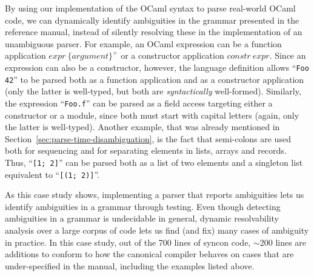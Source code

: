 \documentclass[acmsmall,review,anonymous]{acmart}\settopmatter{printfolios=true,printccs=false,printacmref=false}
\newcommand{\ocaml}{\lstinline[language={[objective]caml}]}
\begin{document}
By using our implementation of the OCaml syntax to parse
real-world OCaml code, we can dynamically identify ambiguities in
the grammar presented in the reference manual, instead of silently
resolving these in the implementation of an unambiguous parser.
%
For example, an OCaml expression can be a function application
$\mathit{expr}~\{\mathit{argument}\}^{+}$ or a constructor
application $\mathit{constr}~\mathit{expr}$. Since an expression
can also be a constructor, however, the language definition allows
``\ocaml{Foo 42}'' to be parsed both as a function application and
as a constructor application (only the latter is well-typed, but
both are \emph{syntactically} well-formed).
%
Similarly, the expression ``\ocaml{Foo.f}'' can be parsed as a
field access targeting either a constructor or a module, since
both must start with capital letters (again, only the latter is
well-typed).
%
Another example, that was already mentioned in
Section~\ref{sec:parse-time-disambiguation}, is the fact that
semi-colons are used both for sequencing and for separating
elements in lists, arrays and records. Thus, ``\ocaml{[1; 2]}''
can be parsed both as a list of two elements and a singleton list
equivalent to ``\ocaml{[(1; 2)]}''.

As this case study shows, implementing a parser that reports
ambiguities lets us identify ambiguities in a grammar through
testing. Even though detecting ambiguities in a grammar is
undecidable in general, dynamic resolvability analysis over a
large corpus of code lets us find (and fix) many cases of
ambiguity in practice.
%
In this case study, out of the 700 lines of syncon code, $\sim$200
lines are additions to conform to how the canonical compiler
behaves on cases that are under-specified in the
manual, including the examples listed above.

\end{document}
